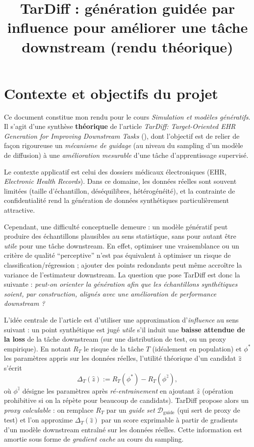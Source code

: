 \documentclass[11pt]{article}
\title{TarDiff : génération guidée par influence pour améliorer une tâche downstream (rendu théorique)}
\date{}
\begin{document}
\maketitle

\section*{Contexte et objectifs du projet}
Ce document constitue mon rendu pour le cours \emph{Simulation et modèles génératifs}. Il s'agit d'une synthèse \textbf{théorique} de l'article \emph{TarDiff: Target-Oriented EHR Generation for Improving Downstream Tasks} (\cite{tardiff}), dont l'objectif est de relier de façon rigoureuse un \emph{mécanisme de guidage} (au niveau du sampling d'un modèle de diffusion) à une \emph{amélioration mesurable} d'une tâche d'apprentissage supervisé.

Le contexte applicatif est celui des dossiers médicaux électroniques (EHR, \emph{Electronic Health Records}). Dans ce domaine, les données réelles sont souvent limitées (taille d'échantillon, déséquilibres, hétérogénéité), et la contrainte de confidentialité rend la génération de données synthétiques particulièrement attractive.

Cependant, une difficulté conceptuelle demeure : un modèle génératif peut produire des échantillons plausibles au sens statistique, sans pour autant être \emph{utile} pour une tâche downstream. En effet, optimiser une vraisemblance ou un critère de qualité ``perceptive'' n'est pas équivalent à optimiser un risque de classification/régression ; ajouter des points redondants peut même accroître la variance de l'estimateur downstream. La question que pose TarDiff est donc la suivante : \emph{peut-on orienter la génération afin que les échantillons synthétiques soient, par construction, alignés avec une amélioration de performance downstream ?}

L'idée centrale de l'article est d'utiliser une approximation d'\emph{influence} au sens suivant : un point synthétique est jugé \emph{utile} s'il induit une \textbf{baisse attendue de la loss} de la tâche downstream (sur une distribution de test, ou un proxy empirique). En notant $R_T$ le risque de la tâche $T$ (idéalement en population) et $\phi^*$ les paramètres appris sur les données réelles, l'utilité théorique d'un candidat $\hat z$ s'écrit
\[
\Delta_T(\hat z) := R_T(\phi^*)-R_T(\phi^{\hat z}),
\]
où $\phi^{\hat z}$ désigne les paramètres après \emph{ré-entrainement} en ajoutant $\hat z$ (opération prohibitive si on la répète pour beaucoup de candidats).
TarDiff propose alors un \emph{proxy calculable} : on remplace $R_T$ par un \emph{guide set} $\mathcal D_{\text{guide}}$ (qui sert de proxy de test) et l'on approxime $\Delta_T(\hat z)$ par un score exprimable à partir de gradients d'un modèle downstream entraîné sur les données réelles. Cette information est amortie sous forme de \emph{gradient cache} au cours du sampling.
\end{document}
